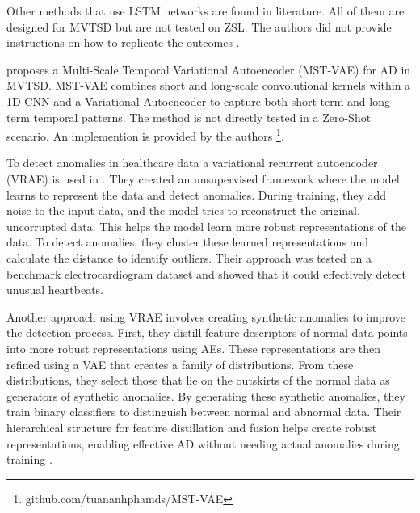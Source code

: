 Other methods that use LSTM networks are found in literature. All of them are designed for MVTSD but are not tested on ZSL. The authors did not provide instructions on how to replicate the outcomes
\cite{yokkampon_robust_2022} \cite{gao_tsmae_2023} \cite{niu_lstm-based_2020}.

\cite{pham_mst-vae_2022} proposes a Multi-Scale Temporal Variational Autoencoder (MST-VAE) for AD in MVTSD. MST-VAE combines short and long-scale convolutional kernels within a 1D CNN and a Variational Autoencoder to capture both short-term and long-term temporal patterns. The method is not directly tested in a Zero-Shot scenario. An implemention is provided by the authors \footnote{\fussy\tiny github.com/tuananhphamds/MST-VAE}.


To detect anomalies in healthcare data a variational recurrent autoencoder (VRAE) is used in \cite{pereira_learning_2019}. They created an unsupervised framework where the model learns to represent the data and detect anomalies. During training, they add noise to the input data, and the model tries to reconstruct the original, uncorrupted data. This helps the model learn more robust representations of the data. To detect anomalies, they cluster these learned representations and calculate the distance to identify outliers. Their approach was tested on a benchmark electrocardiogram dataset and showed that it could effectively detect unusual heartbeats.

%
Another approach using VRAE involves creating synthetic anomalies to improve the detection process. First, they distill feature descriptors of normal data points into more robust representations using AEs. These representations are then refined using a VAE that creates a family of distributions. From these distributions, they select those that lie on the outskirts of the normal data as generators of synthetic anomalies.
By generating these synthetic anomalies, they train binary classifiers to distinguish between normal and abnormal data. Their hierarchical structure for feature distillation and fusion helps create robust representations, enabling effective AD without needing actual anomalies during training \cite{ramirez_rivera_anomaly_2022}.

